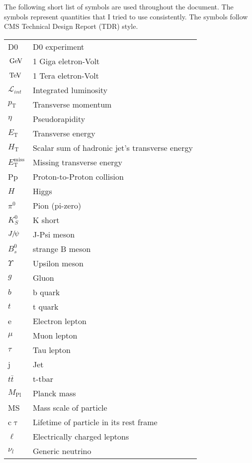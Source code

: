 \documentclass[11pt,expanded,copyright]{fsuthesis}
\newcommand {\DZERO}{D0\xspace}     %
\newcommand{\GeV}{\ensuremath{\,\text{Ge\hspace{-.08em}V}}\xspace}
\newcommand{\TeV}{\ensuremath{\,\text{Te\hspace{-.08em}V}}\xspace}
\newcommand{\Lumi}{\ensuremath{\mathcal{L}}\xspace}%
\newcommand{\Mpl}{\ensuremath{{M_\mathrm{Pl}}}\xspace}%
\newcommand{\pt}{\ensuremath{p_{\mathrm{T}}}\xspace}
\newcommand{\ET}{\ensuremath{E_{\mathrm{T}}}\xspace}
\newcommand{\HT}{\ensuremath{H_{\mathrm{T}}}\xspace}
\newcommand{\ETm}{\ensuremath{E_{\mathrm{T}}^{\text{miss}}}\xspace}
\newcommand{\MET}{\ETm}
\newcommand{\cmsSymbolFace}[1]{#1}
\providecommand{\PH}{\ensuremath{\cmsSymbolFace{H}}\xspace} %
\providecommand{\PJGy}{\ensuremath{\cmsSymbolFace{J}\hspace{-.08em}/\hspace{-.14em}\psi}\xspace} %
\providecommand{\PBzs}{\ensuremath{\cmsSymbolFace{B}^0_\cmsSymbolFace{s}}\xspace} %
\providecommand{\Pg}{\ensuremath{\cmsSymbolFace{g}}\xspace} %
\providecommand{\PGnl}{\ensuremath{\nu_\cmsSymbolFace{l}}\xspace} %
\providecommand{\PQt}{\ensuremath{\cmsSymbolFace{t}}\xspace} %
\providecommand{\PQb}{\ensuremath{\cmsSymbolFace{b}}\xspace} %
\providecommand{\PAQt}{\ensuremath{\bar{\cmsSymbolFace{t}}}\xspace} %
\providecommand{\PKzS}{\ensuremath{\cmsSymbolFace{K}^0_\cmsSymbolFace{S}}\xspace} %
\newcommand{\ttbar}{{\PQt{}\PAQt}\xspace} %
\begin{document}
\tableofcontents
\listoftables
\listoffigures
\begin{listofsymbols}
The following short list of symbols are used throughout the document.
The symbols represent quantities that I tried to use consistently.
The symbols follow CMS Technical Design Report (TDR) style.
\begin{center}
\begin{tabular}{ll}
\DZERO & D0 experiment \\
\GeV & 1 Giga eletron-Volt \\
\TeV & 1 Tera eletron-Volt \\
$\Lumi_{int}$ & Integrated luminosity\\
\pt & Transverse momentum \\
$\eta$ & Pseudorapidity \\
\ET & Transverse energy\\
\HT & Scalar sum of hadronic jet's transverse energy\\
\MET & Missing transverse energy\\
Pp & Proton-to-Proton collision\\
\PH & Higgs\\
$\pi^{0}$ & Pion (pi-zero)\\
$\PKzS$ & K short\\
\PJGy & J-Psi meson\\
$\PBzs$ & strange B meson\\
$\Upsilon$ & Upsilon meson\\
\Pg & Gluon\\
\PQb & b quark\\
\PQt & t quark\\
e & Electron lepton\\
$\mu$ & Muon lepton\\
$\tau$ & Tau lepton\\
j & Jet\\
\ttbar & t-tbar \\
\Mpl & Planck mass\\
MS & Mass scale of particle\\
c$\uptau$ & Lifetime of particle in its rest frame\\
$\ell$ & Electrically charged leptons\\
\PGnl & Generic neutrino\\
\end{tabular}
\end{center}
\end{listofsymbols}

\end{document}
